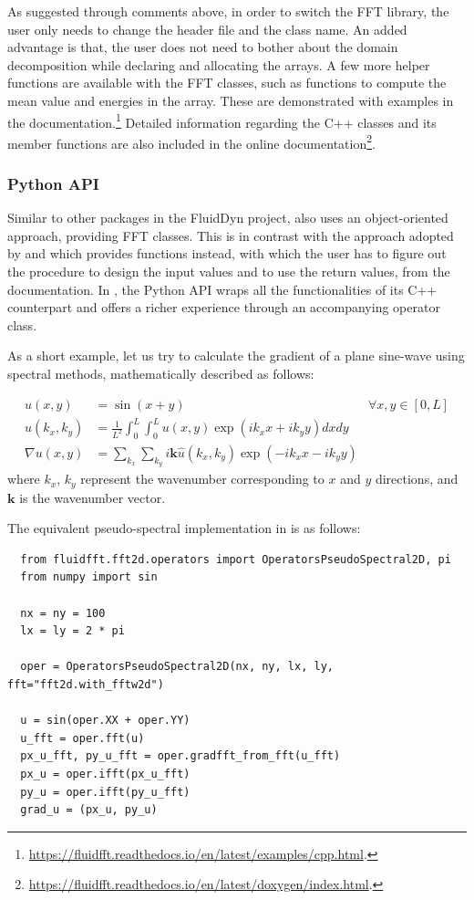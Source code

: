 As suggested through comments above, in order to switch the FFT library, the
user only needs to change the header file and the class name. An added
advantage is that, the user does not need to bother about the domain
decomposition while declaring and allocating the arrays. A few more helper
functions are available with the FFT classes, such as functions to compute the
mean value and energies in the array. These are demonstrated with examples in
the documentation.\footnote{%
\url{https://fluidfft.readthedocs.io/en/latest/examples/cpp.html}.}
%
Detailed information regarding the C++ classes and its member functions are
also included in the online documentation\footnote{%
\url{https://fluidfft.readthedocs.io/en/latest/doxygen/index.html}.}.

\subsubsection{Python API} Similar to other packages in the FluidDyn project,
 also uses an object-oriented approach, providing FFT classes.
%
This is in contrast with the approach adopted by  and  which provides functions instead, with which the user has to
figure out the procedure to design the input values and to use the return
values, from the documentation.
%
In , the Python API wraps all the functionalities of its C++
counterpart and offers a richer experience through an accompanying
operator class.

As a short example, let us try to calculate the gradient of a plane sine-wave
using spectral methods, mathematically described as follows:

\begin{align*}
  u(x,y) &=
    \sin(x + y) &\forall x,y \in \left[0, L \right] \\
  \hat u(k_x,k_y) &=
    \frac{1}{L^2}
    \int_0^{L}\int_0^{L}
    u(x,y) \exp(ik_x x + ik_y y) dx dy \\
  \nabla u(x,y) &=
    \sum_{k_x} \sum_{k_y}
    i\mathbf{k}
    \hat u(k_x,k_y) \exp(-ik_x x - ik_y y)
\end{align*}
%
where $k_x$, $k_y$ represent the wavenumber corresponding to $x$ and $y$ directions,
and $\mathbf{k}$ is the wavenumber vector.

The equivalent pseudo-spectral implementation in  is as follows:
\begin{verbatim}
  from fluidfft.fft2d.operators import OperatorsPseudoSpectral2D, pi
  from numpy import sin

  nx = ny = 100
  lx = ly = 2 * pi

  oper = OperatorsPseudoSpectral2D(nx, ny, lx, ly, fft="fft2d.with_fftw2d")

  u = sin(oper.XX + oper.YY)
  u_fft = oper.fft(u)
  px_u_fft, py_u_fft = oper.gradfft_from_fft(u_fft)
  px_u = oper.ifft(px_u_fft)
  py_u = oper.ifft(py_u_fft)
  grad_u = (px_u, py_u)
\end{verbatim}

